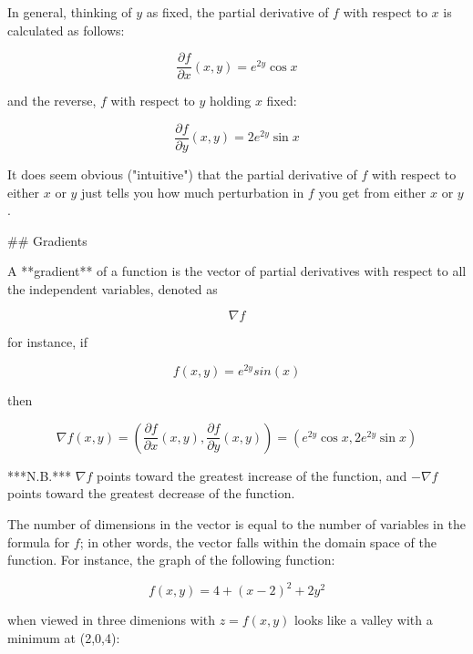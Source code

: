 \begin{markdown}
\begin{definition}
In general, thinking of $y$ as fixed, the partial derivative of $f$ with respect
to $x$ is calculated as follows:

\begin{equation}
    \frac{\partial f}{\partial x}(x,y) = e^{2y}\cos{x}
\end{equation}

and the reverse, $f$ with respect to $y$ holding $x$ fixed:

\begin{equation}
    \frac{\partial f}{\partial y}(x,y) = 2e^{2y}\sin{x}
\end{equation}

It does seem obvious ("intuitive") that the partial derivative of $f$ with
respect to either $x$ or $y$ just tells you how much perturbation in $f$ you get
from either $x$ or $y$.

## Gradients

A **gradient** of a function is the vector of partial derivatives with respect
to all the independent variables, denoted as

\begin{equation}
    \nabla f
\end{equation}

for instance, if

\begin{equation}
    f(x,y) = e^{2y}sin(x)
\end{equation}

then

\begin{equation}
    \nabla f(x,y) =
    \left( \frac{\partial f}{\partial x}(x,y), \frac{\partial f}{\partial y}(x,y) \right) =
    (e^{2y}\cos{x}, 2e^{2y}\sin{x})
\end{equation}

***N.B.*** $\nabla f$ points toward the greatest increase of the function, and
$-\nabla f$ points toward the greatest decrease of the function.

The number of dimensions in the vector is equal to the number of variables in
the formula for $f$; in other words, the vector falls within the domain space of
the function. For instance, the graph of the following function:

\begin{equation}
    f(x,y) = 4 + (x - 2)^2 + 2y^2
\end{equation}

when viewed in three dimenions with $z = f(x,y)$ looks like a valley with a
minimum at (2,0,4):


\end{definition}
\end{markdown}
